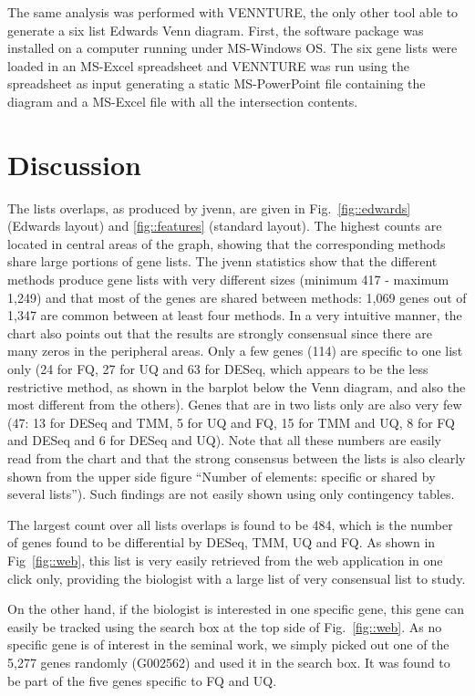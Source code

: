 \documentclass{bmcart}
\begin{document}
The same analysis was performed with VENNTURE, the only other tool able to
generate a six list Edwards Venn diagram. First, the software package was
installed on a computer running under MS-Windows OS. The six gene lists were 
loaded in an MS-Excel spreadsheet and VENNTURE was run using the spreadsheet as
input generating a static MS-PowerPoint file containing the diagram and a MS-Excel
file with all the intersection contents.

\section*{Discussion}

The lists overlaps, as produced by jvenn, are given in Fig.~\ref{fig::edwards} 
(Edwards layout) and \ref{fig::features} (standard layout). The highest counts
are located in central areas of the graph, showing that the corresponding
methods share large portions of gene lists. The jvenn statistics show that the
different methods produce gene lists with very different sizes (minimum 417 -
maximum 1,249) and that most of the genes are shared between methods: 1,069
genes out of 1,347 are common between at least four methods.
In a very intuitive manner, the chart also points out that the results are
strongly consensual since there are many zeros in the peripheral areas. Only a
few genes (114) are specific to one list only (24 for FQ, 27 for UQ and 63 for
DESeq, which appears to be the less restrictive method, as shown in the barplot
below the Venn diagram, and also the most different from the others). 
Genes that are in two lists only are also very few (47: 13 for DESeq and TMM, 5
for UQ and FQ, 15 for TMM and UQ, 8 for FQ and DESeq and 6 for DESeq and UQ). 
Note that all these numbers are easily read from the chart and that the strong
consensus between the lists is also clearly shown from the upper side figure
``Number of elements: specific or shared by several lists''). Such findings are
not easily shown using only contingency tables.

The largest count over all lists overlaps is found to be 484, which is the
number of genes found to be differential by DESeq, TMM, UQ and FQ. As shown in
Fig~\ref{fig::web}, this list is very easily retrieved from the web application 
in one click only, providing the biologist with a large list of very consensual
list to study.

On the other hand, if the biologist is interested in one specific gene, this 
gene can easily be tracked using the search box at the top side of
Fig.~\ref{fig::web}. As no specific gene is of interest in the seminal work, we
simply picked out one of the 5,277 genes randomly (G002562) and used it in the
search box. It was found to be part of the five genes specific to FQ and UQ.
\end{document}

